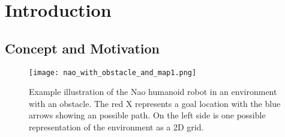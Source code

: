 \chapter{Introduction} \label{ch:introduction}

\section{Concept and Motivation}


\begin{figure}[h!]
	\centering
	\texttt{[image: nao\_with\_obstacle\_and\_map1.png]}
	\caption
	{Example illustration of the Nao humanoid robot in an environment with an obstacle. The red X represents a goal
		location with the blue arrows showing an possible path. On the left side is one possible representation
		of the environment as a 2D grid.}
	\label{fig:nao_with_map1}
\end{figure}

